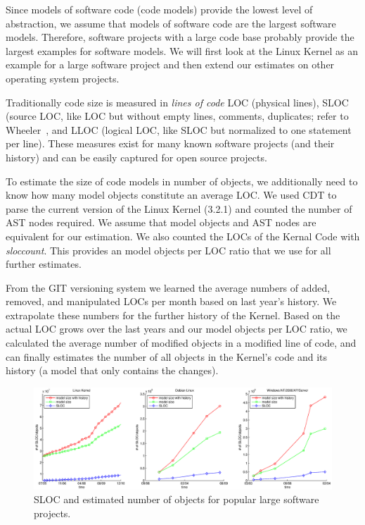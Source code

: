Since models of software code (code models) provide the lowest level of abstraction, we assume that models of software code are the largest software models. Therefore, software projects with a large code base probably provide the largest examples for software models. We will first look at the Linux Kernel as an example for a large software project and then extend our estimates on other operating system projects.

Traditionally code size is measured in \emph{lines of code} LOC (physical lines), SLOC (source LOC, like LOC but without empty lines, comments, duplicates; refer to Wheeler~\cite{wheeler}, and LLOC (logical LOC, like SLOC but normalized to one statement per line). These measures exist for many known software projects (and their history) and can be easily captured for open source projects. 

To estimate the size of code models in number of objects, we additionally need to know how many model objects constitute an average LOC. We used CDT to parse the current version of the Linux Kernel (3.2.1) and counted the number of AST nodes required. We assume that model objects and AST nodes are equivalent for our estimation. We also counted the LOCs of the Kernal Code with \emph{sloccount}. This provides an model objects per LOC ratio that we use for all further estimates.

From the GIT versioning system we learned the average numbers of added, removed, and manipulated LOCs per month based on last year's history. We extrapolate these numbers for the further history of the Kernel. Based on the actual LOC grows over the last years and our model objects per LOC ratio, we calculated the average number of modified objects in a modified line of code, and can finally estimates the number of all objects in the Kernel's code and its history (a model that only contains the changes).

\begin{figure}
  \centering
  \includegraphics[width=\linewidth]{figures/software_model_sizes}
  \caption{SLOC and estimated number of objects for popular large software projects.}
  \label{fig:software_model_sizes}
\end{figure}


